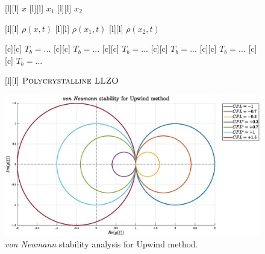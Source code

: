 \begin{figure}[ht]
	\centering
	\footnotesize

	[l] {$x$}
	[l] {$x_1$}
	[l] {$x_2$}

	[l] {$\rho(x,t)$}
	[l] {$\rho(x_{1},t)$}
	[l] {$\rho(x_{2},t)$}

	[c] {$T_{b} = ... $}
	[c] {$T_{b} = ... $}
	[c] {$T_{b} = ... $}
	[c] {$T_{b} = ... $}
	[c] {$T_{b} = ... $}
	[c] {$T_{b} = ... $}


	[l] {$\textsc{Polycrystalline LLZO}$}

	\includegraphics[width=1.0\textwidth]{vonNeumannstabil.eps}
	\caption{\emph{von Neumann} stability analysis for Upwind method.}
	\label{\LABEL}
\end{figure}

